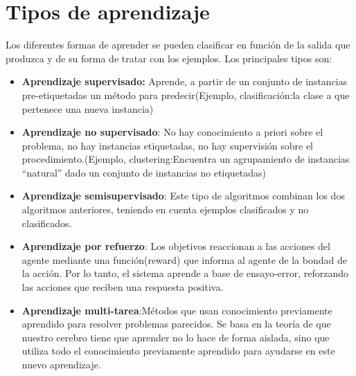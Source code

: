 \documentclass[a4paper, 11pt]{article} %
\begin{document}
\section{Tipos de aprendizaje}
Los diferentes formas de aprender se pueden clasificar en función de la salida que produzca y de su forma de tratar con los ejemplos. Los principales tipos son:
\begin{itemize}
	\item \textbf{Aprendizaje supervisado:} Aprende, a partir de un conjunto de instancias pre-etiquetadas un método para predecir(Ejemplo, clasificación:la clase a que pertenece una nueva instancia)
	\item \textbf{Aprendizaje no supervisado}: No hay conocimiento a priori sobre el problema, no hay instancias etiquetadas, no hay supervisión sobre el procedimiento.(Ejemplo, clustering:Encuentra un agrupamiento de instancias “natural” dado un conjunto de instancias no etiquetadas)
	\item \textbf{Aprendizaje semisupervisado}: Este tipo de algoritmos combinan los dos algoritmos anteriores, teniendo en cuenta ejemplos clasificados y no clasificados.
	\item \textbf{Aprendizaje por refuerzo}: Los objetivos reaccionan a las acciones del agente mediante una función(reward) que informa al agente de la bondad de la acción. Por lo tanto, el sistema aprende a base de ensayo-error, reforzando las acciones que reciben una respuesta positiva.
	\item \textbf{Aprendizaje multi-tarea}:Métodos que usan conocimiento previamente aprendido para resolver problemas parecidos. Se basa en la teoría de que nuestro cerebro tiene que aprender no lo hace de forma aislada, sino que utiliza todo el conocimiento previamente aprendido para ayudarse en este nuevo aprendizaje.
\end{itemize}
\end{document}
